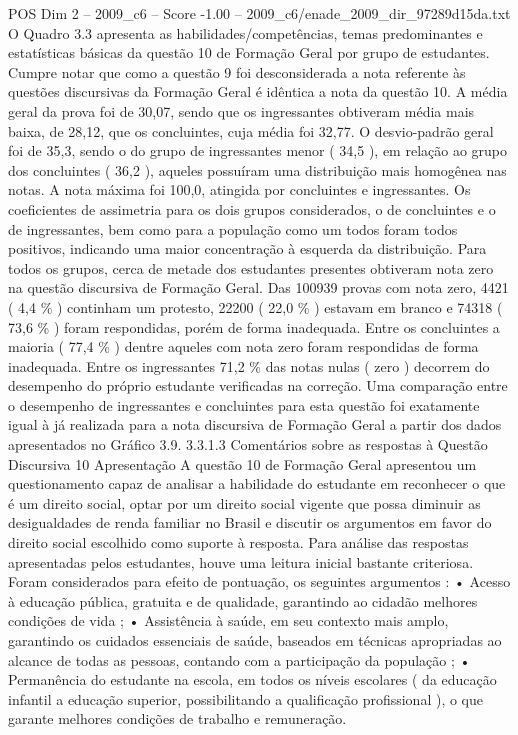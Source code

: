 \begin{textsample}{POS Dim 2 – 2009\_c6 – Score -1.00 – 2009\_c6/enade\_2009\_dir\_97289d15da.txt}
O Quadro 3.3 apresenta as habilidades/competências, temas predominantes e estatísticas básicas da questão 10 de Formação Geral por grupo de estudantes.
Cumpre notar que como a questão 9 foi desconsiderada a nota referente às questões discursivas da Formação Geral é idêntica a nota da questão 10.
A média geral da prova foi de 30,07, sendo que os ingressantes obtiveram média mais baixa, de 28,12, que os concluintes, cuja média foi 32,77.
O desvio-padrão geral foi de 35,3, sendo o do grupo de ingressantes menor ( 34,5 ), em relação ao grupo dos concluintes ( 36,2 ), aqueles possuíram uma distribuição mais homogênea nas notas.
A nota máxima foi 100,0, atingida por concluintes e ingressantes.
Os coeficientes de assimetria para os dois grupos considerados, o de concluintes e o de ingressantes, bem como para a população como um todos foram todos positivos, indicando uma maior concentração à esquerda da distribuição.
Para todos os grupos, cerca de metade dos estudantes presentes obtiveram nota zero na questão discursiva de Formação Geral.
Das 100939 provas com nota zero, 4421 ( 4,4 \% ) continham um protesto, 22200 ( 22,0 \% ) estavam em branco e 74318 ( 73,6 \% ) foram respondidas, porém de forma inadequada.
Entre os concluintes a maioria ( 77,4 \% ) dentre aqueles com nota zero foram respondidas de forma inadequada.
Entre os ingressantes 71,2 \% das notas nulas ( zero ) decorrem do desempenho do próprio estudante verificadas na correção.
Uma comparação entre o desempenho de ingressantes e concluintes para esta questão foi exatamente igual à já realizada para a nota discursiva de Formação Geral a partir dos dados apresentados no Gráfico 3.9. 3.3.1.3 Comentários sobre as respostas à Questão Discursiva 10 Apresentação A questão 10 de Formação Geral apresentou um questionamento capaz de analisar a habilidade do estudante em reconhecer o que é um direito social, optar por um direito social vigente que possa diminuir as desigualdades de renda familiar no Brasil e discutir os argumentos em favor do direito social escolhido como suporte à resposta.
Para análise das respostas apresentadas pelos estudantes, houve uma leitura inicial bastante criteriosa.
Foram considerados para efeito de pontuação, os seguintes argumentos : • Acesso à educação pública, gratuita e de qualidade, garantindo ao cidadão melhores condições de vida ; • Assistência à saúde, em seu contexto mais amplo, garantindo os cuidados essenciais de saúde, baseados em técnicas apropriadas ao alcance de todas as pessoas, contando com a participação da população ; • Permanência do estudante na escola, em todos os níveis escolares ( da educação infantil a educação superior, possibilitando a qualificação profissional ), o que garante melhores condições de trabalho e remuneração.

\end{textsample}
